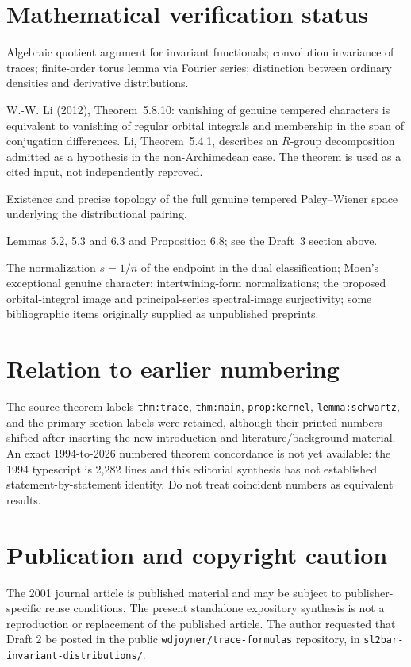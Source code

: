 \documentclass[12pt,letterpaper]{article}
\begin{document}
\section*{Mathematical verification status}
\begin{description}[style=nextline]
\item[Directly checked] Algebraic quotient argument for invariant
functionals; convolution invariance of traces; finite-order torus lemma
via Fourier series; distinction between ordinary densities and derivative
distributions.
\item[Checked in a cited source] W.-W. Li (2012), Theorem~5.8.10:
vanishing of genuine tempered characters is equivalent to vanishing of
regular orbital integrals and membership in the span of conjugation
differences.  Li, Theorem~5.4.1, describes an $R$-group decomposition
admitted as a hypothesis in the non-Archimedean case.  The theorem is
used as a cited input, not independently reproved.
\item[Conditional] Existence and precise topology of the full genuine
tempered Paley--Wiener space underlying the distributional pairing.
\item[Proved in Draft 3] Lemmas 5.2, 5.3 and 6.3 and Proposition 6.8; see the Draft~3 section above.
\item[Unverified against original sources] The normalization $s=1/n$ of the endpoint
in the dual classification; Moen's exceptional genuine character;
intertwining-form normalizations; the proposed orbital-integral image
and principal-series spectral-image surjectivity; some bibliographic
items originally supplied as unpublished preprints.
\end{description}
\section*{Relation to earlier numbering}
The source theorem labels \texttt{thm:trace}, \texttt{thm:main},
\texttt{prop:kernel}, \texttt{lemma:schwartz}, and the primary section
labels were retained, although their printed numbers shifted after
inserting the new introduction and literature/background material.
An exact 1994-to-2026 numbered theorem concordance is not yet available:
the 1994 typescript is 2,282 lines and this editorial synthesis has not
established statement-by-statement identity.  Do not treat coincident
numbers as equivalent results.

\section*{Publication and copyright caution}
The 2001 journal article is published material and may be subject to
publisher-specific reuse conditions. The present standalone expository
synthesis is not a reproduction or replacement of the published article.
The author requested that Draft 2 be posted in the public
\texttt{wdjoyner/trace-formulas} repository, in
\texttt{sl2bar-invariant-distributions/}.
\end{document}
